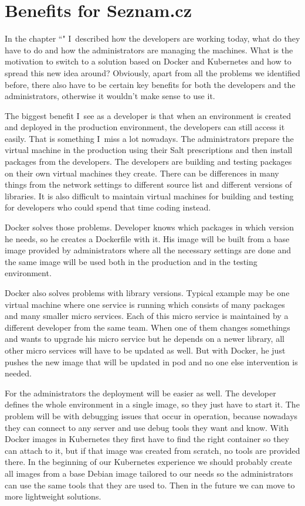 \chapter{Benefits for Seznam.cz}

In the chapter ``" I~described how the developers are working today, what do they have to do and how the administrators are managing the machines. What is the motivation to switch to a solution based on Docker and Kubernetes and how to spread this new idea around? Obviously, apart from all the problems we identified before, there also have to be certain key benefits for both the developers and the administrators, otherwise it wouldn’t make sense to use it.

The biggest benefit I~see as a developer is that when an environment is created and deployed in the production environment, the developers can still access it easily. That is something I~miss a lot nowadays. The administrators prepare the virtual machine in the production using their Salt \cite{salt} prescriptions and then install packages from the developers. The developers are building and testing packages on their own virtual machines they create. There can be differences in many things from the network settings to different source list and different versions of libraries. It is also difficult to maintain virtual machines for building and testing for developers who could spend that time coding instead.

Docker solves those problems. Developer knows which packages in which version he needs, so he creates a Dockerfile with it. His image will be built from a base image provided by administrators where all the necessary settings are done and the same image will be used both in the production and in the testing environment. 

Docker also solves problems with library versions. Typical example may be one virtual machine where one service is running which consists of many packages and many smaller micro services. Each of this micro service is maintained by a different developer from the same team. When one of them changes somethings and wants to upgrade his micro service but he depends on a newer library, all other micro services will have to be updated as well. But with Docker, he just pushes the new image that will be updated in pod and no one else intervention is needed.

For the administrators the deployment will be easier as well. The developer defines the whole environment in a single image, so they just have to start it. The problem will be with debugging issues that occur in operation, because nowadays they can connect to any server and use debug tools they want and know. With Docker images in Kubernetes they first have to find the right container so they can attach to it, but if that image was created from scratch, no tools are provided there. In the beginning of our Kubernetes experience we should probably create all images from a base Debian image tailored to our needs so the administrators can use the same tools that they are used to. Then in the future we can move to more lightweight solutions.

